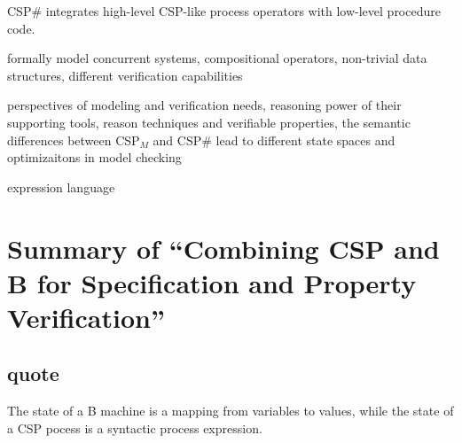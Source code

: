 \documentclass{llncs}
\newcommand{\cspm}{CSP$_M$}
\newcommand{\csps}{CSP\#}
\begin{document}
\csps{} integrates high-level CSP-like process operators with low-level
procedure code.

formally model concurrent systems, compositional operators, non-trivial data
structures, different verification capabilities

perspectives of modeling and verification needs, reasoning power of their
supporting tools, reason techniques and verifiable properties, the semantic
differences between \cspm{} and \csps{} lead to different state spaces and
optimizaitons in model checking

expression language


\newpage
% 
% 


 

\section{Summary of ``Combining CSP and B for Specification and 
Property Verification''\cite{Butler2005Combining}}


\subsection{quote}
The state of a B machine is a mapping from variables to values, 
while the state of a CSP pocess is a syntactic process expression.


\newpage
% 
% 


 
\end{document}
